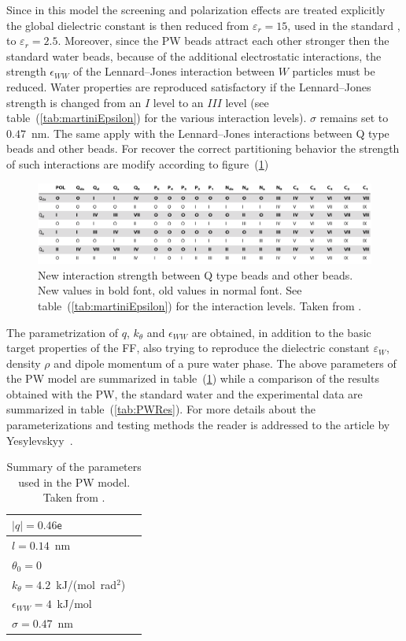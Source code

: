 Since in this model the screening and polarization effects are treated explicitly the global dielectric constant 
is then reduced from $\varepsilon_r = 15$, used in the standard \martini, to $\varepsilon_r = 2.5$. Moreover, 
since the \ac{PW} beads attract each other stronger then the standard water beads, because of the additional 
electrostatic interactions, the strength $\epsilon_{WW}$ of the Lennard--Jones interaction between $W$ particles 
must be reduced. Water properties are reproduced satisfactory if the Lennard--Jones strength is changed from an 
$I$ level to an $III$ level (see table~(\ref{tab:martiniEpsilon}) for the various interaction levels). $\sigma$ 
remains set to $0.47$~nm. The same apply with the Lennard--Jones interactions between Q type beads and other 
beads. For recover the correct partitioning behavior the strength of such interactions are modify according to 
figure~(\ref{fig:PWMartini})
\begin{figure}[!ht]
	\centering
	\includegraphics[width=\textwidth]{./img/PWMartini}
	\caption{New interaction strength between Q type beads and other beads. New values in bold font, old values in normal font. See table~(\ref{tab:martiniEpsilon}) for the interaction levels. Taken from \cite{PW}.}
	\label{fig:PWMartini}
\end{figure}

The parametrization of $q$, $k_\theta$ and $\epsilon_{WW}$ are obtained, in addition to the basic target 
properties of the \martini \ac{FF}, also trying to reproduce the dielectric constant $\varepsilon_{W}$, density 
$\rho$ and dipole momentum of a pure water phase. The above parameters of the \ac{PW} model are summarized in 
table~(\ref{tab:PWParam}) while a comparison of the results obtained with the \ac{PW}, the standard \martini 
water and the experimental data are summarized in table~(\ref{tab:PWRes}). For more details about the 
parameterizations and testing methods the reader is 
addressed to the article by Yesylevskyy \etal\,\cite{PW}.
\begin{table}
	\centering
	\begin{tabular}{ll}
		\toprule
		$|q| = 0.46\mathsf{e}$				\\ \midrule
		$l = 0.14$~nm						\\ \midrule
		$\theta_0 = 0$						\\ \midrule
		$k_\theta = 4.2$~kJ/(mol\ rad$^2$)	\\ \midrule
		$\epsilon_{WW} = 4$~kJ/mol			\\ \midrule
		$\sigma = 0.47$~nm					\\ \bottomrule
	\end{tabular}
	\caption{Summary of the parameters used in the \acs{PW} model. Taken from \cite{PW}.}
	\label{tab:PWParam}
\end{table}

